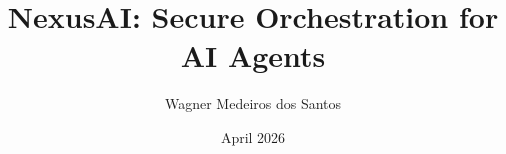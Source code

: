 \documentclass{article}
\title{NexusAI: Secure Orchestration for AI Agents}
\author{Wagner Medeiros dos Santos}
\date{April 2026}
\begin{document}
\maketitle
\nages%
\end{document}
